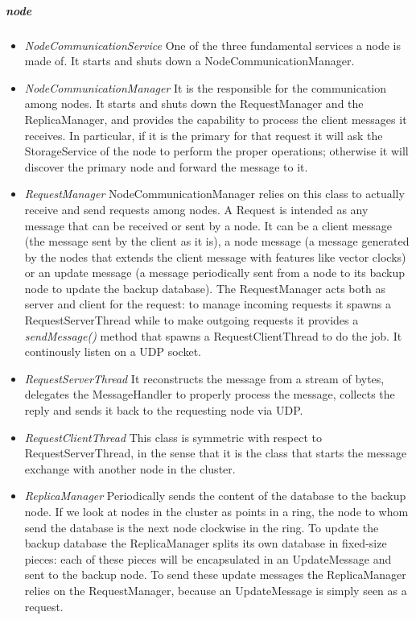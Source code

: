 \documentclass{article}
\begin{document}
\subparagraph{node} 
\begin{itemize}
\item \textit{NodeCommunicationService} One of the three fundamental services a node is made of. It starts and shuts down a NodeCommunicationManager.
\item \textit{NodeCommunicationManager} It is the responsible for the communication among nodes. It starts and shuts down the RequestManager and the ReplicaManager, and provides the capability to process the client messages it receives. In particular, if it is the primary for that request it will ask the StorageService of the node to perform the proper operations; otherwise it will discover the primary node and forward the message to it.
\item \textit{RequestManager} NodeCommunicationManager relies on this class to actually receive and send requests among nodes. A Request is intended as any message that can be received or sent by a node. It can be a client message (the message sent by the client as it is), a node message (a message generated by the nodes that extends the client message with features like vector clocks) or an update message (a message periodically sent from a node to its backup node to update the backup database). The RequestManager acts both as server and client for the request: to manage incoming requests it spawns a RequestServerThread while to make outgoing requests it provides a \textit{sendMessage()} method that spawns a RequestClientThread to do the job. It continously listen on a UDP socket.
\item \textit{RequestServerThread} It reconstructs the message from a stream of bytes, delegates the MessageHandler to properly process the message, collects the reply and sends it back to the requesting node via UDP.
\item \textit{RequestClientThread} This class is symmetric with respect to RequestServerThread, in the sense that it is the class that starts the message exchange with another node in the cluster.
\item \textit{ReplicaManager} Periodically sends the content of the database to the backup node. If we look at nodes in the cluster as points in a ring, the node to whom send the database is the next node clockwise in the ring. To update the backup database the ReplicaManager splits its own database in fixed-size pieces: each of these pieces will be encapsulated in an UpdateMessage and sent to the backup node. To send these update messages the ReplicaManager relies on the RequestManager, because an UpdateMessage is simply seen as a request.
\end{itemize}
\end{document}
